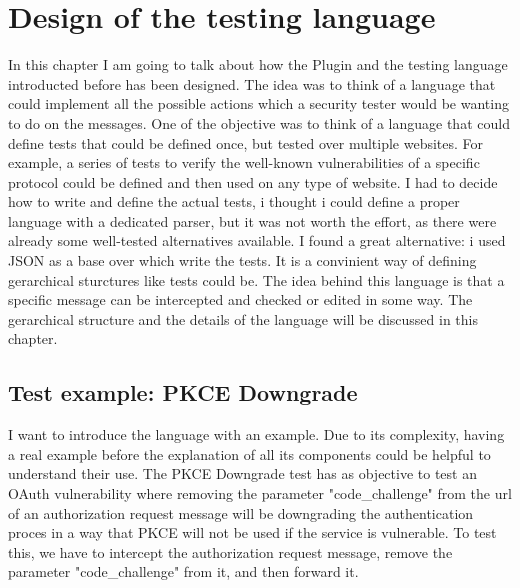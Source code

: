 \chapter{Design of the testing language}
In this chapter I am going to talk about how the Plugin and the testing language introducted before has been designed. The idea was to think of a language that could implement all the possible actions which a security tester would be wanting to do on the messages. One of the objective was to think of a language that could define tests that could be defined once, but tested over multiple websites. For example, a series of tests to verify the well-known vulnerabilities of a specific protocol could be defined and then used on any type of website.
I had to decide how to write and define the actual tests, i thought i could define a proper language with a dedicated parser, but it was not worth the effort, as there were already some well-tested alternatives available. I found a great alternative: i used JSON as a base over which write the tests. It is a convinient way of defining gerarchical sturctures like tests could be.
The idea behind this language is that a specific message can be intercepted and checked or edited in some way.
The gerarchical structure and the details of the language will be discussed in this chapter.

\section{Test example: PKCE Downgrade}
I want to introduce the language with an example. Due to its complexity, having a real example before the explanation of all its components could be helpful to understand their use.
The PKCE Downgrade test has as objective to test an OAuth vulnerability where removing the parameter "code\_challenge" from the url of an authorization request message will be downgrading the authentication proces in a way that PKCE will not be used if the service is vulnerable. To test this, we have to intercept the authorization request message, remove the parameter "code\_challenge" from it, and then forward it.


